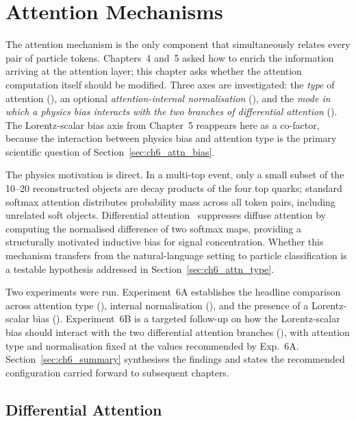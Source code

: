 \chapter{Attention Mechanisms}
\label{ch:attention}

The attention mechanism is the only component that simultaneously relates every pair
of particle tokens. Chapters~4 and~5 asked how to enrich the information arriving at
the attention layer; this chapter asks whether the attention computation itself should
be modified. Three axes are investigated: the \emph{type} of attention
(), an optional \emph{attention-internal normalisation}
(), and the \emph{mode in which a physics bias interacts with the two
branches of differential attention} (). The Lorentz-scalar bias axis
 from Chapter~5 reappears here as a co-factor, because the interaction
between physics bias and attention type is the primary scientific question of
Section~\ref{sec:ch6_attn_bias}.

The physics motivation is direct. In a multi-top event, only a small subset of the
10--20 reconstructed objects are decay products of the four top quarks; standard
softmax attention distributes probability mass across all token pairs, including
unrelated soft objects. Differential attention~\cite{YE2025}
suppresses diffuse attention by computing the normalised difference of two softmax
maps, providing a structurally motivated inductive bias for signal concentration.
Whether this mechanism transfers from the natural-language setting to particle
classification is a testable hypothesis addressed in Section~\ref{sec:ch6_attn_type}.

Two experiments were run. Experiment~6A establishes the headline comparison across
attention type (), internal normalisation (), and the
presence of a Lorentz-scalar bias (). Experiment~6B is a targeted
follow-up on how the Lorentz-scalar bias should interact with the two differential
attention branches (), with attention type and normalisation fixed at
the values recommended by Exp.~6A. Section~\ref{sec:ch6_summary} synthesises the
findings and states the recommended configuration carried forward to subsequent
chapters.

\section{Differential Attention}
\label{sec:ch6_diff_attn}

